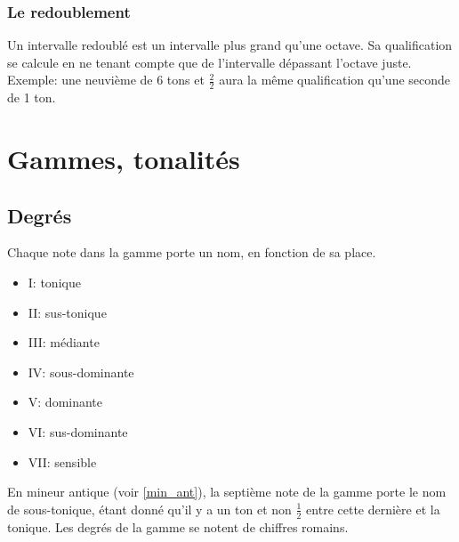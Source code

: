 \documentclass[11pt,a4paper]{scrreprt}
\begin{document}
\vspace{0.5cm}
\begin{center}
\end{center}




\subsection{Le redoublement}
Un intervalle redoublé est un intervalle plus grand qu'une octave. Sa qualification se calcule en ne tenant compte que de l'intervalle dépassant l'octave juste. Exemple: une neuvième de 6 tons et $\frac2 2$ aura la même qualification qu'une seconde de 1 ton.\\

\chapter{Gammes, tonalités}
\section{Degrés}
Chaque note dans la gamme porte un nom, en fonction de sa place. 
\begin{itemize}
\item I: tonique
\item II: sus-tonique
\item III: médiante
\item IV: sous-dominante
\item V: dominante
\item VI: sus-dominante
\item VII: sensible
\end{itemize}
En mineur antique (voir \ref{min_ant}), la septième note de la gamme porte le nom de sous-tonique, étant donné qu'il y a un ton et non $\frac1 2$ entre cette dernière et la tonique. Les degrés de la gamme se notent de chiffres romains.
\end{document}
